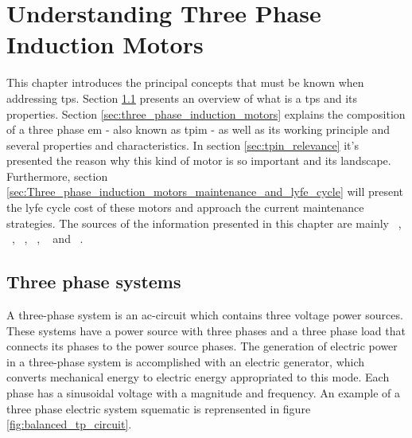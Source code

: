 \chapter{Understanding Three Phase Induction Motors}
\label{cha:users_manual}



This chapter introduces the principal concepts that must be known when addressing \acrfull{tps}. Section \ref{sec:three_phase_systems} presents an overview of what is a \acrshort{tps} and its properties. Section \ref{sec:three_phase_induction_motors} explains the composition of a three phase \acrfull{em} - also known as \acrfull{tpim} - as well as its working principle and several properties and characteristics. In section \ref{sec:tpin_relevance} it's presented the reason why this kind of motor is so important and its landscape. Furthermore, section \ref{sec:Three_phase_induction_motors_maintenance_and_lyfe_cycle} will present the lyfe cycle cost of these motors and approach the current maintenance strategies. The sources of the information presented in this chapter are mainly ~\cite{Helfenstein2000}, ~\cite{Alves2003}, ~\cite{Fitzgerald1985}, ~\cite{Guru2001}, ~\cite{Rashid2011} and ~\cite{Ferreira1}.

\section{Three phase systems} %
\label{sec:three_phase_systems}

A three-phase system is an \acrshort{ac}-circuit which contains three voltage power sources. These systems have a power source with three phases and a three phase load that connects its phases to the power source phases. The generation of electric power in a three-phase system is accomplished with an electric generator, which converts mechanical energy to electric energy appropriated to this mode. Each phase has a sinusoidal voltage with a magnitude and frequency. An example of a three phase electric system squematic is reprensented in figure \ref{fig:balanced_tp_circuit}.

